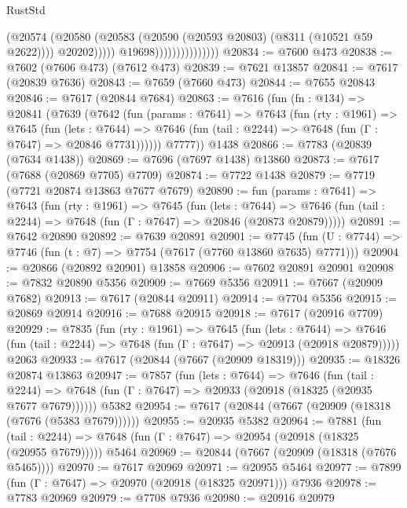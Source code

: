 \begin{lexlean}{RustStd}
\begin{coremodule}
                                        (@20574
                                          (@20580
                                            (@20583
                                              (@20590 (@20593 @20803) (@8311 (@10521 @59 @2622))))
                                            @20202)))))
                                  @19698)))))))))))))))
@20834 := @7600 @473
@20838 := @7602 (@7606 @473) (@7612 @473)
@20839 := @7621 @13857
@20841 := @7617 (@20839 @7636)
@20843 := @7659 (@7660 @473)
@20844 := @7655 @20843
@20846 := @7617 (@20844 @7684)
@20863 := @7616
    (fun (fn : @134) =>
    @20841
      (@7639
        (@7642
          (fun (params : @7641) =>
          @7643
            (fun (rty : @1961) =>
            @7645
              (fun (lets : @7644) =>
              @7646 (fun (tail : @2244) => @7648 (fun (Γ : @7647) => @20846 @7731))))))
        @7777))
    @1438
@20866 := @7783 (@20839 (@7634 @1438))
@20869 := @7696 (@7697 @1438) @13860
@20873 := @7617 (@7688 (@20869 @7705) @7709)
@20874 := @7722 @1438
@20879 := @7719 (@7721 @20874 @13863 @7677 @7679)
@20890 := fun (params : @7641) =>
  @7643
    (fun (rty : @1961) =>
    @7645
      (fun (lets : @7644) =>
      @7646 (fun (tail : @2244) => @7648 (fun (Γ : @7647) => @20846 (@20873 @20879)))))
@20891 := @7642 @20890
@20892 := @7639 @20891
@20901 := @7745
    (fun (U : @7744) => @7746 (fun (t : @7) => @7754 (@7617 (@7760 @13860 @7635) @7771)))
@20904 := @20866 (@20892 @20901) @13858
@20906 := @7602 @20891 @20901
@20908 := @7832 @20890 @5356
@20909 := @7669 @5356
@20911 := @7667 (@20909 @7682)
@20913 := @7617 (@20844 @20911)
@20914 := @7704 @5356
@20915 := @20869 @20914
@20916 := @7688 @20915
@20918 := @7617 (@20916 @7709)
@20929 := @7835
    (fun (rty : @1961) =>
    @7645
      (fun (lets : @7644) =>
      @7646 (fun (tail : @2244) => @7648 (fun (Γ : @7647) => @20913 (@20918 @20879)))))
    @2063
@20933 := @7617 (@20844 (@7667 (@20909 @18319)))
@20935 := @18326 @20874 @13863
@20947 := @7857
    (fun (lets : @7644) =>
    @7646
      (fun (tail : @2244) =>
      @7648 (fun (Γ : @7647) => @20933 (@20918 (@18325 (@20935 @7677 @7679))))))
    @5382
@20954 := @7617 (@20844 (@7667 (@20909 (@18318 (@7676 (@5383 @7679))))))
@20955 := @20935 @5382
@20964 := @7881
    (fun (tail : @2244) => @7648 (fun (Γ : @7647) => @20954 (@20918 (@18325 (@20955 @7679)))))
    @5464
@20969 := @20844 (@7667 (@20909 (@18318 (@7676 @5465))))
@20970 := @7617 @20969
@20971 := @20955 @5464
@20977 := @7899 (fun (Γ : @7647) => @20970 (@20918 (@18325 @20971))) @7936
@20978 := @7783 @20969
@20979 := @7708 @7936
@20980 := @20916 @20979

\end{coremodule}
\end{lexlean}
